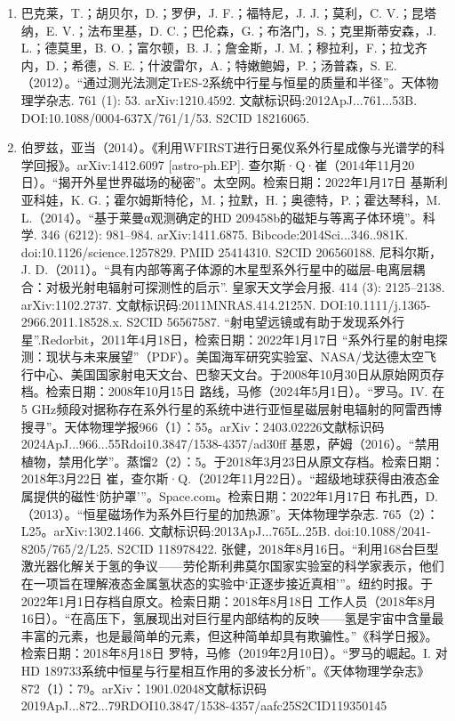 \begin{enumerate}
\item 巴克莱，T.；胡贝尔，D.；罗伊，J. F.；福特尼，J. J.；莫利，C. V.；昆塔纳，E. V.；法布里基，D. C.；巴伦森，G.；布洛门，S.；克里斯蒂安森，J. L.；德莫里，B. O.；富尔顿，B. J.；詹金斯，J. M.；穆拉利，F.；拉戈齐内，D.；希德，S. E.；什波雷尔，A.；特嫩鲍姆，P.；汤普森，S. E.（2012）。“通过测光法测定TrES-2系统中行星与恒星的质量和半径”。天体物理学杂志. 761 (1): 53. arXiv:1210.4592. 文献标识码:2012ApJ...761...53B. DOI:10.1088/0004-637X/761/1/53. S2CID 18216065.
\item 伯罗兹，亚当（2014）。《利用WFIRST进行日冕仪系外行星成像与光谱学的科学回报》。arXiv:1412.6097 [astro-ph.EP].
 查尔斯·Q·崔（2014年11月20日）。“揭开外星世界磁场的秘密”。太空网。检索日期：2022年1月17日
 基斯利亚科娃，K. G.；霍尔姆斯特伦，M.；拉默，H.；奥德特，P.；霍达琴科，M. L.（2014）。“基于莱曼α观测确定的HD 209458b的磁矩与等离子体环境”。科学. 346 (6212): 981–984. arXiv:1411.6875. Bibcode:2014Sci...346..981K. doi:10.1126/science.1257829. PMID 25414310. S2CID 206560188.
 尼科尔斯，J. D.（2011）。“具有内部等离子体源的木星型系外行星中的磁层-电离层耦合：对极光射电辐射可探测性的启示”. 皇家天文学会月报. 414 (3): 2125–2138. arXiv:1102.2737. 文献标识码:2011MNRAS.414.2125N. DOI:10.1111/j.1365-2966.2011.18528.x. S2CID 56567587.
 “射电望远镜或有助于发现系外行星”.Redorbit，2011年4月18日，检索日期：2022年1月17日
 “系外行星的射电探测：现状与未来展望”（PDF）。美国海军研究实验室、NASA/戈达德太空飞行中心、美国国家射电天文台、巴黎天文台。于2008年10月30日从原始网页存档。检索日期：2008年10月15日
 路线，马修（2024年5月1日）。“罗马。IV. 在5 GHz频段对据称存在系外行星的系统中进行亚恒星磁层射电辐射的阿雷西博搜寻”。天体物理学报966（1）：55。arXiv：2403.02226文献标识码2024ApJ...966...55Rdoi10.3847/1538-4357/ad30ff
 基恩，萨姆（2016）。“禁用植物，禁用化学”。蒸馏2（2）：5。于2018年3月23日从原文存档。检索日期：2018年3月22日
 崔，查尔斯·Q.（2012年11月22日）。“超级地球获得由液态金属提供的磁性‘防护罩’”。Space.com。检索日期：2022年1月17日
 布扎西，D.（2013）。“恒星磁场作为系外巨行星的加热源”。天体物理学杂志. 765（2）：L25。arXiv:1302.1466. 文献标识码:2013ApJ...765L..25B. doi:10.1088/2041-8205/765/2/L25. S2CID 118978422.
 张健，2018年8月16日。“利用168台巨型激光器化解关于氢的争议——劳伦斯利弗莫尔国家实验室的科学家表示，他们在一项旨在理解液态金属氢状态的实验中‘正逐步接近真相’”。纽约时报。于2022年1月1日存档自原文。检索日期：2018年8月18日
 工作人员（2018年8月16日）。“在高压下，氢展现出对巨行星内部结构的反映——氢是宇宙中含量最丰富的元素，也是最简单的元素，但这种简单却具有欺骗性。”《科学日报》。检索日期：2018年8月18日
 罗特，马修（2019年2月10日）。“罗马的崛起。I. 对HD 189733系统中恒星与行星相互作用的多波长分析”。《天体物理学杂志》872（1）：79。arXiv：1901.02048文献标识码2019ApJ...872...79RDOI10.3847/1538-4357/aafc25S2CID119350145

\end{enumerate}
